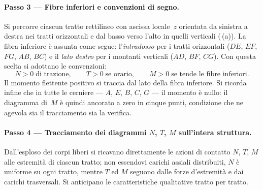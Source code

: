 





\paragraph{Passo 3 --- Fibre inferiori e convenzioni di segno.}

Si percorre ciascun tratto rettilineo con ascissa locale~$z$
orientata da sinistra a destra nei tratti orizzontali e dal
basso verso l'alto in quelli verticali (\,(a)). La fibra inferiore
è assunta come segue: l'\emph{intradosso} per i tratti
orizzontali ($DE$, $EF$, $FG$, $AB$, $BC$) e il \emph{lato
	destro} per i montanti verticali ($AD$, $BF$, $CG$).
Con questa scelta si adottano le convenzioni:
\[
N > 0 \;\text{di trazione},
\qquad
T > 0 \;\text{se orario},
\qquad
M > 0 \;\text{se tende le fibre inferiori}.
\]
Il momento flettente positivo si traccia dal lato della
fibra inferiore. Si ricorda infine che in tutte le
cerniere --- $A$, $E$, $B$, $C$, $G$ --- il momento è
nullo: il diagramma di~$M$ è quindi ancorato a zero in
cinque punti, condizione che ne agevola sia il tracciamento
sia la verifica.




\paragraph{Passo 4 --- Tracciamento dei diagrammi
	$N$, $T$, $M$ sull'intera struttura.}

Dall'esploso dei corpi liberi si ricavano direttamente le
azioni di contatto $N$, $T$, $M$ alle estremità di ciascun
tratto; non essendovi carichi assiali distribuiti, $N$ è
uniforme su ogni tratto, mentre $T$ ed $M$ seguono dalle
forze d'estremità e dai carichi trasversali. Si anticipano
le caratteristiche qualitative tratto per tratto.

